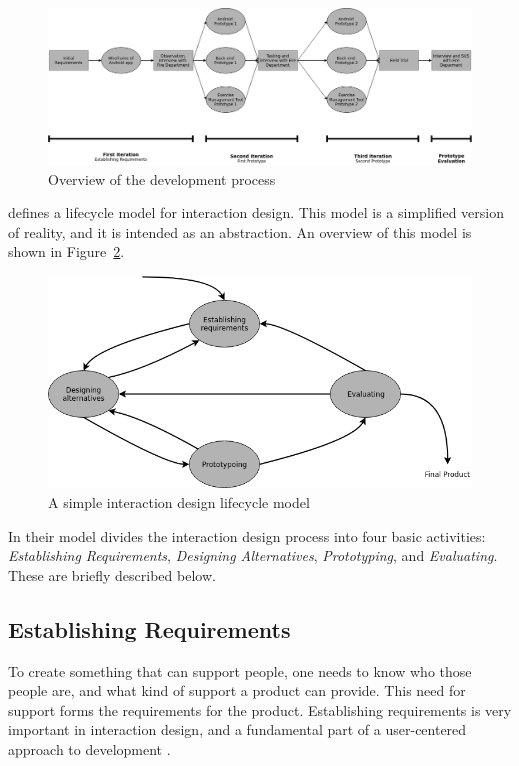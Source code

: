 \documentclass[../Main/thesis.tex]{subfiles}
\begin{document}
\begin{figure}[h]
	\centering
	\includegraphics[width=\textwidth]{../fig/Method-diagram}
	\caption{Overview of the development process}
	\label{fig:method-diagram}
\end{figure}

\citet{Preece2011} defines a lifecycle model for interaction design.
This model is a simplified version of reality, and it is intended as an abstraction.
An overview of this model is shown in Figure~\ref{fig:interaction-design-lifecycle}.

\begin{figure}[h]
	\centering
	\includegraphics[width=\textwidth]{../fig/Interaction-design-lifecycle}
	\caption[A simple interaction design lifecycle model]{A simple interaction design lifecycle model \citep[p.332]{Preece2011}}
	\label{fig:interaction-design-lifecycle}
\end{figure}


In their model \citet{Preece2011} divides the interaction design process into four basic activities: \textit{Establishing Requirements}, \textit{Designing Alternatives}, \textit{Prototyping}, and \textit{Evaluating}.
These are briefly described below.

\subsection{Establishing Requirements}
To create something that can support people, one needs to know who those people are, and what kind of support a product can provide. 
This need for support forms the requirements for the product.
Establishing requirements is very important in interaction design, and a fundamental part of a user-centered approach to development \citep{Preece2011}.
\end{document}
